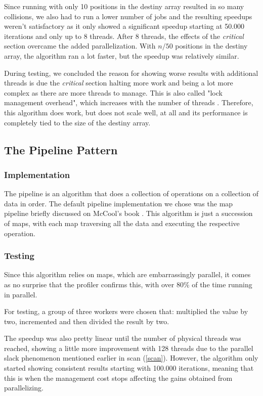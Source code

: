 \documentclass[10pt,journal]{IEEEtran}
\begin{document}
Since running with only 10 positions in the destiny array resulted in so many collisions, we also had to run a lower number of jobs and the resulting speedups weren't satisfactory as it only showed a significant speedup starting at 50.000 iterations and only up to 8 threads. After 8 threads, the effects of the \textit{critical} section overcame the added parallelization. With $ n / 50 $ positions in the destiny array, the algorithm ran a lot faster, but the speedup was relatively similar. 

During testing, we concluded the reason for showing worse results with additional threads is due the \textit{critical} section halting more work and being a lot more complex as there are more threads to manage. This is also called "lock management overhead", which increases with the number of threads \cite{lockmanage}. Therefore, this algorithm does work, but does not scale well, at all and its performance is completely tied to the size of the destiny array.

\subsection{The Pipeline Pattern}
\subsubsection{Implementation}

The pipeline is an algorithm that does a collection of operations on a collection of data in order. The default pipeline implementation we chose was the map pipeline briefly discussed on McCool's book \cite{mccool}. This algorithm is just a succession of maps, with each map traversing all the data and executing the respective operation.

\subsubsection{Testing}

Since this algorithm relies on maps, which are embarrassingly parallel, it comes as no surprise that the profiler confirms this, with over 80\% of the time running in parallel.

For testing, a group of three workers were chosen that: multiplied the value by two, incremented and then divided the result by two.

The speedup was also pretty linear until the number of physical threads was reached, showing a little more improvement with 128 threads due to the parallel slack phenomenon mentioned earlier in scan (\ref{scan}). However, the algorithm only started showing consistent results starting with 100.000 iterations, meaning that this is when the management cost stops affecting the gains obtained from parallelizing.
\end{document}
